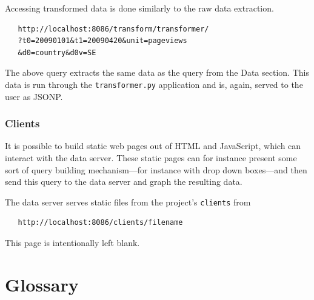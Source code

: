 Accessing transformed data is done similarly to the raw data extraction.

\begin{verbatim}
   http://localhost:8086/transform/transformer/
   ?t0=20090101&t1=20090420&unit=pageviews
   &d0=country&d0v=SE
\end{verbatim}

The above query extracts the same data as the query from the Data
section. This data is run through the \texttt{transformer.py} application and
is, again, served to the user as JSONP.


\subsection*{Clients}

It is possible to build static web pages out of HTML and JavaScript, which
can interact with the data server. These static pages can for instance
present some sort of query building mechanism---for instance with drop down
boxes---and then send this query to the data server and graph the resulting
data.

The data server serves static files from the project's \texttt{clients} from

\begin{verbatim}
   http://localhost:8086/clients/filename
\end{verbatim}


\pagebreak
This page is intentionally left blank.
\pagebreak


\chapter{Glossary}

